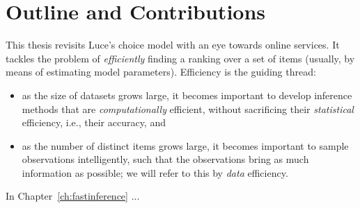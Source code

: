 \section{Outline and Contributions}
\label{in:sec:outline}

This thesis revisits Luce's choice model with an eye towards online services.
It tackles the problem of \emph{efficiently} finding a ranking over a set of items (usually, by means of estimating model parameters).
Efficiency is the guiding thread:
\begin{itemize}
\item as the size of datasets grows large, it becomes important to develop inference methods that are \emph{computationally} efficient, without sacrificing their \emph{statistical} efficiency, i.e., their accuracy, and
\item as the number of distinct items grows large, it becomes important to sample observations intelligently, such that the observations bring as much information as possible; we will refer to this by \emph{data} efficiency.
\end{itemize}

In Chapter~\ref{ch:fastinference} ...
